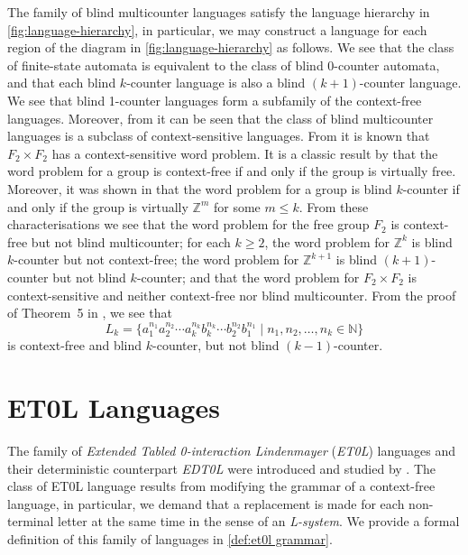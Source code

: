 The family of blind multicounter languages satisfy the language hierarchy in \cref{fig:language-hierarchy}, in particular, we may construct a language for each region of the diagram in \cref{fig:language-hierarchy} as follows.
We see that the class of finite-state automata is equivalent to the class of blind $0$-counter automata, and that each blind $k$-counter language is also a blind $(k+1)$-counter language.
We see that blind 1-counter languages form a subfamily of the context-free languages.
Moreover, from \cite[Theorem~1]{greibach1978} it can be seen that the class of blind multicounter languages is a subclass of context-sensitive languages.
From \cite{shapiro1994} it is known that $F_2 \times F_2$ has a context-sensitive word problem.
It is a classic result by \textcite{muller1983} that the word problem for a group is context-free if and only if the group is virtually free.
Moreover, it was shown in \cite{elder2008} that the word problem for a group is blind $k$-counter if and only if the group is virtually $\mathbb{Z}^m$ for some $m \leqslant k$.
From these characterisations we see that the word problem for the free group $F_2$ is context-free but not blind multicounter; for each $k \geqslant 2$, the word problem for $\mathbb{Z}^k$ is blind $k$-counter but not context-free; the word problem for $\mathbb{Z}^{k+1}$ is blind $(k+1)$-counter but not blind $k$-counter; and that the word problem for $F_2 \times F_2$ is context-sensitive and neither context-free nor blind multicounter.
From the proof of Theorem~5 in \cite{greibach1978}, we see that
\[
	L_k
	=
	\{
		a_1^{n_1}
		a_2^{n_2}
		\cdots
		a_k^{n_k}
		b_k^{n_k}
		\cdots
		b_2^{n_2}
		b_1^{n_1}
	\mid
		n_1,n_2,\ldots,n_k \in \mathbb{N}
	\}
\]
is context-free and blind $k$-counter, but not blind $(k-1)$-counter.

\section{ET0L Languages}\label{sec:et0l-language}

The family of \emph{Extended Tabled 0-interaction Lindenmayer} (\emph{ET0L}) languages and their deterministic counterpart \emph{EDT0L} were introduced and studied by \textcite{rozenberg1973}.
The class of ET0L language results from modifying the grammar of a context-free language, in particular, we demand that a replacement is made for each non-terminal letter at the same time in the sense of an \emph{L-system}.
We provide a formal definition of this family of languages in \cref{def:et0l grammar}.

